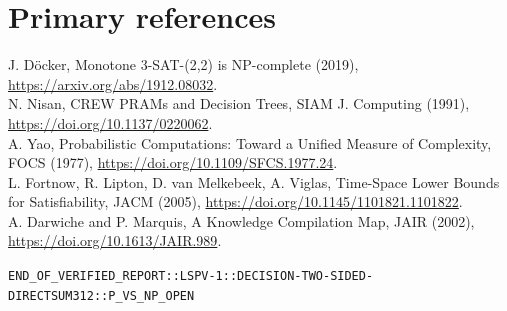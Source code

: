 \documentclass[11pt]{article}
\begin{document}
\section{Primary references}
\noindent[1] J. D\"ocker, Monotone 3-SAT-(2,2) is NP-complete (2019), \url{https://arxiv.org/abs/1912.08032}.\\
[2] N. Nisan, CREW PRAMs and Decision Trees, SIAM J. Computing (1991), \url{https://doi.org/10.1137/0220062}.\\
[3] A. Yao, Probabilistic Computations: Toward a Unified Measure of Complexity, FOCS (1977), \url{https://doi.org/10.1109/SFCS.1977.24}.\\
[4] L. Fortnow, R. Lipton, D. van Melkebeek, A. Viglas, Time-Space Lower Bounds for Satisfiability, JACM (2005), \url{https://doi.org/10.1145/1101821.1101822}.\\
[5] A. Darwiche and P. Marquis, A Knowledge Compilation Map, JAIR (2002), \url{https://doi.org/10.1613/JAIR.989}.
\par\noindent\texttt{END\_OF\_VERIFIED\_REPORT::LSPV-1::DECISION-TWO-SIDED-DIRECTSUM312::P\_VS\_NP\_OPEN}
\end{document}
